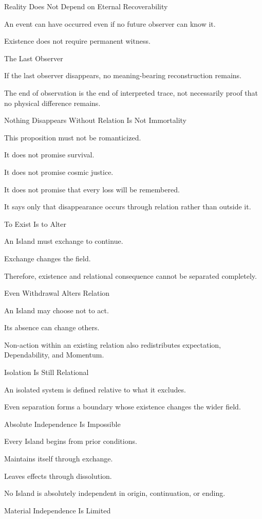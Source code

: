 Reality Does Not Depend on Eternal Recoverability

An event can have occurred even if no future observer can know it.

Existence does not require permanent witness.

The Last Observer

If the last observer disappears, no meaning-bearing reconstruction remains.

The end of observation is the end of interpreted trace, not necessarily proof that no physical difference remains.

Nothing Disappears Without Relation Is Not Immortality

This proposition must not be romanticized.

It does not promise survival.

It does not promise cosmic justice.

It does not promise that every loss will be remembered.

It says only that disappearance occurs through relation rather than outside it.

To Exist Is to Alter

An Island must exchange to continue.

Exchange changes the field.

Therefore, existence and relational consequence cannot be separated completely.

Even Withdrawal Alters Relation

An Island may choose not to act.

Its absence can change others.

Non-action within an existing relation also redistributes expectation, Dependability, and Momentum.

Isolation Is Still Relational

An isolated system is defined relative to what it excludes.

Even separation forms a boundary whose existence changes the wider field.

Absolute Independence Is Impossible

Every Island begins from prior conditions.

Maintains itself through exchange.

Leaves effects through dissolution.

No Island is absolutely independent in origin, continuation, or ending.

Material Independence Is Limited

